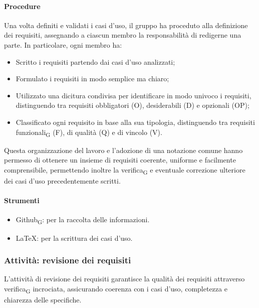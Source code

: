 \documentclass[11pt,a4paper]{article}
\newcommand{\gls}[1]{#1\textsubscript{G}}
\begin{document}
\paragraph{Procedure}
Una volta definiti e validati i casi d’uso, il gruppo ha proceduto alla definizione dei requisiti, assegnando a ciascun membro la responsabilità di redigerne una parte. In particolare, ogni membro ha:
\begin{itemize}
\item Scritto i requisiti partendo dai casi d’uso analizzati;
\item Formulato i requisiti in modo semplice ma chiaro;
\item Utilizzato una dicitura condivisa per identificare in modo univoco i requisiti, distinguendo tra requisiti obbligatori (O), desiderabili (D) e opzionali (OP);
\item Classificato ogni requisito in base alla sua tipologia, distinguendo tra \gls{requisiti funzionali} (F), di qualità (Q) e di vincolo (V).
\end{itemize}
Questa organizzazione del lavoro e l’adozione di una notazione comune hanno permesso di ottenere un insieme di requisiti coerente, uniforme e facilmente comprensibile, permettendo inoltre la \gls{verifica} e eventuale correzione ulteriore dei casi d’uso precedentemente scritti.

\paragraph{Strumenti}
\begin{itemize}
\item \gls{Github}: per la raccolta delle informazioni.
\item LaTeX: per la scrittura dei casi d'uso.
\end{itemize}

\subsubsection{Attività: revisione dei requisiti}
L’attività di revisione dei requisiti garantisce la qualità dei requisiti attraverso \gls{verifica} incrociata, assicurando coerenza con i casi d’uso, completezza e chiarezza delle specifiche.
\end{document}
